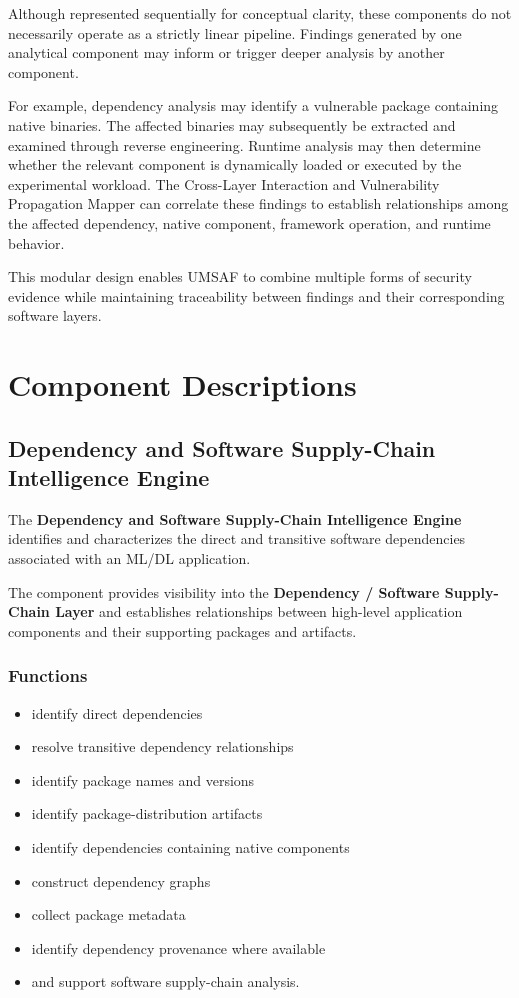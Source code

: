 \documentclass[
  12pt,
  letterpaper,
  oneside]{report}
\providecommand{\tightlist}{%
  \setlength{\itemsep}{0pt}\setlength{\parskip}{0pt}}
\begin{document}
Although represented sequentially for conceptual clarity, these
components do not necessarily operate as a strictly linear pipeline.
Findings generated by one analytical component may inform or trigger
deeper analysis by another component.

For example, dependency analysis may identify a vulnerable package
containing native binaries. The affected binaries may subsequently be
extracted and examined through reverse engineering. Runtime analysis may
then determine whether the relevant component is dynamically loaded or
executed by the experimental workload. The Cross-Layer Interaction and
Vulnerability Propagation Mapper can correlate these findings to
establish relationships among the affected dependency, native component,
framework operation, and runtime behavior.

This modular design enables UMSAF to combine multiple forms of security
evidence while maintaining traceability between findings and their
corresponding software layers.

\section{Component Descriptions}\label{103-component-descriptions}

\subsection{Dependency and Software Supply-Chain Intelligence Engine}\label{1031-dependency-and-software-supply-chain-intelligence-engine}

The \textbf{Dependency and Software Supply-Chain Intelligence Engine}
identifies and characterizes the direct and transitive software
dependencies associated with an ML/DL application.

The component provides visibility into the \textbf{Dependency / Software
Supply-Chain Layer} and establishes relationships between high-level
application components and their supporting packages and artifacts.

\subsubsection{Functions}\label{functions}

\begin{itemize}
\tightlist
\item
  identify direct dependencies
\item
  resolve transitive dependency relationships
\item
  identify package names and versions
\item
  identify package-distribution artifacts
\item
  identify dependencies containing native components
\item
  construct dependency graphs
\item
  collect package metadata
\item
  identify dependency provenance where available
\item
  and support software supply-chain analysis.
\end{itemize}
\end{document}
